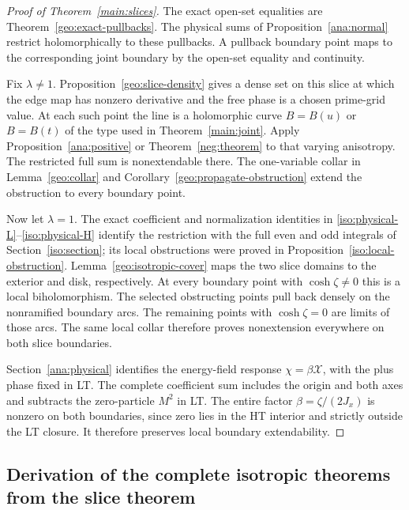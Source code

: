 \documentclass[11pt]{article}
\numberwithin{equation}{section}
\theoremstyle{definition}
\begin{document}
\begin{proof}[Proof of Theorem~\ref{main:slices}]
The exact open-set equalities are Theorem~\ref{geo:exact-pullbacks}.
The physical sums of Proposition~\ref{ana:normal} restrict
holomorphically to these pullbacks. A pullback boundary point
maps to the corresponding joint boundary by the open-set equality
and continuity.

Fix \(\lambda\ne1\). Proposition~\ref{geo:slice-density} gives a
dense set on this slice at which the edge map has nonzero derivative
and the free phase is a chosen prime-grid value. At each such point
the line is a holomorphic curve \(B=B(u)\) or \(B=B(t)\) of the
type used in Theorem~\ref{main:joint}. Apply
Proposition~\ref{ana:positive} or Theorem~\ref{neg:theorem} to
that varying anisotropy. The restricted full sum is nonextendable
there. The one-variable collar in Lemma~\ref{geo:collar} and
Corollary~\ref{geo:propagate-obstruction} extend the obstruction
to every boundary point.

Now let \(\lambda=1\). The exact coefficient and normalization
identities in \eqref{iso:physical-L}--\eqref{iso:physical-H}
identify the restriction with the full even and odd integrals of
Section~\ref{iso:section}; its local obstructions were proved in
Proposition~\ref{iso:local-obstruction}. Lemma~\ref{geo:isotropic-cover} maps the two
slice domains to the exterior and disk, respectively. At every
boundary point with \(\cosh\zeta\ne0\) this is a local
biholomorphism. The selected obstructing points pull back densely
on the nonramified boundary arcs. The remaining points with
\(\cosh\zeta=0\) are limits of those arcs. The same local collar
therefore proves nonextension everywhere on both slice boundaries.

Section~\ref{ana:physical} identifies the energy-field response
\(\chi=\beta\mathcal X\), with the plus phase fixed in LT. The
complete coefficient sum includes the origin and both axes and
subtracts the zero-particle \(M^2\) in LT. The entire factor
\(\beta=\zeta/(2J_x)\) is nonzero on both boundaries, since zero
lies in the HT interior and strictly outside the LT closure.
It therefore preserves local boundary extendability.
\end{proof}

\subsection{Derivation of the complete isotropic theorems from the slice theorem}
\end{document}

